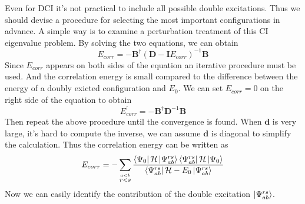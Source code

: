 \documentclass[11pt]{article}
\begin{document}
Even for DCI it's not practical to include all possible double excitations. Thus we should devise a procedure for selecting
the most important configurations in advance. A simple way is to examine a perturbation treatment of this CI eigenvalue problem.
By solving the two equations, we can obtain
\begin{equation}
    E_{corr}=-\mathbf{B}^\dagger{(\mathbf{D}-\mathbf{I}E_{corr})}^{-1}\mathbf{B}
\end{equation}
Since $E_{corr}$ appears on both sides of the equation an iterative procedure must be used. And the correlation energy is small
compared to the difference between the energy of a doubly exicted configuration and $E_0$. We can set $E_{corr}=0$ on the right side
of the equation to obtain
\begin{equation}
    E^{'}_{corr}=-\mathbf{B}^\dagger{\mathbf{D}}^{-1}\mathbf{B}
\end{equation}
Then repeat the above procedure until the convergence is found. When $\mathbf{d}$ is very large, it's hard to compute the inverse,
we can assume $\mathbf{d}$ is diagonal to simplify the calculation. Thus the correlation energy can be written as
\begin{equation}
    E_{corr}=-\sum_{\stackrel{a<b}{r<s}}\frac{\bra{\Psi_0}\mathcal{H}\ket{\Psi_{ab}^{rs}}\bra{\Psi_{ab}^{rs}}\mathcal{H}\ket{\Psi_0}}{\bra{\Psi_{ab}^{rs}}\mathcal{H}-E_0\ket{\Psi_{ab}^{rs}}}
\end{equation}
Now we can easily identify the contribution of the double excitation $\ket{\Psi_{ab}^{rs}}$.
\end{document}
